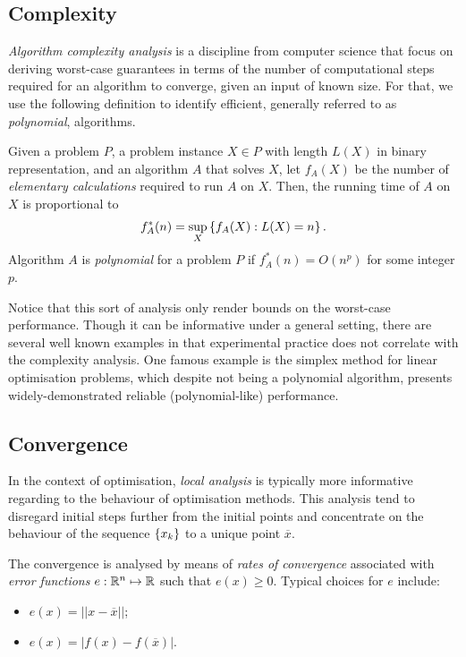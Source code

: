 \subsection{Complexity}

\emph{Algorithm complexity analysis} is a discipline from computer science that focus on deriving worst-case guarantees in terms of the number of computational steps required for an algorithm to converge, given an input of known size. For that, we use the following definition to identify efficient, generally referred to as \emph{polynomial}, algorithms.

\begin{definition}
    Given a problem $P$, a problem instance $X \in P$ with length $L(X)$ in binary representation, and an algorithm $A$ that solves $X$, let $f_A(X)$ be the number of \emph{elementary calculations} required to run $A$ on $X$. Then, the running time of $A$ on $X$ is proportional to $$f^*_A(n) = \sup_X\left\{ f_A(X) : L(X) = n \right \}.$$ Algorithm $A$ is \emph{polynomial} for a problem $P$ if $f^*_A(n) = O(n^p)$ for some integer $p$.
\end{definition}

Notice that this sort of analysis only render bounds on the worst-case performance. Though it can be informative under a general setting, there are several well known examples in that experimental practice does not correlate with the complexity analysis. One famous example is the simplex method for linear optimisation problems, which despite not being a polynomial algorithm, presents widely-demonstrated reliable (polynomial-like) performance. 

\subsection{Convergence}

In the context of optimisation, \emph{local analysis} is typically more informative regarding to the behaviour of optimisation methods. This analysis tend to disregard initial steps further from the initial points and concentrate on the behaviour of the sequence $\left\{ x_k \right \}$ to a unique point $\overline{x}$.

The convergence is analysed by means of \emph{rates of convergence} associated with \emph{error functions} $e: \mathbb{R}^n \mapsto \mathbb{R}$ such that $e(x) \geq 0$. Typical choices for $e$ include:
\begin{itemize}
\item $e(x) = ||x - \overline{x}||$;
\item $e(x) = |f(x) - f(\overline{x})|$.
\end{itemize}

